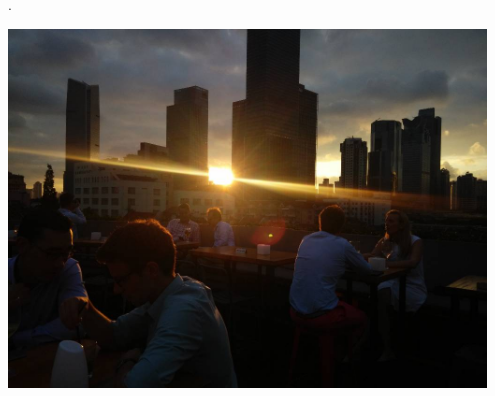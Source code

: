 \documentclass[a4paper,12pt]{article}
\begin{document}
\selectfont\textcolor{Ivory1}{.} \\

%
{%
    
}%
{%
{%
    
}{%
    
}}

\begin{center}
\begin{minipage}[l]{0.75\textwidth}
\includegraphics[width=0.95\textwidth]{photo.jpg}
\end{minipage}
\end{center}
\vfill
\begin{minipage}[r]{0.95\textwidth}
    \linespread{2.0}
\raggedleft
\em
\ClosingPoem
\end{minipage}
    
\end{document}
